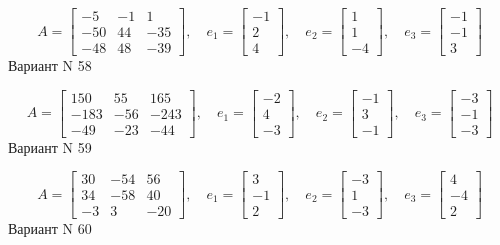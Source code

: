 \documentclass[11pt]{report}
\begin{document}
$$A = \left[\begin{matrix}-5 & -1 & 1\\-50 & 44 & -35\\-48 & 48 & -39\end{matrix}\right],\quad e_1 = \left[\begin{matrix}-1\\2\\4\end{matrix}\right],\quad e_2 = \left[\begin{matrix}1\\1\\-4\end{matrix}\right],\quad e_3 = \left[\begin{matrix}-1\\-1\\3\end{matrix}\right]$$Вариант N 58

$$A = \left[\begin{matrix}150 & 55 & 165\\-183 & -56 & -243\\-49 & -23 & -44\end{matrix}\right],\quad e_1 = \left[\begin{matrix}-2\\4\\-3\end{matrix}\right],\quad e_2 = \left[\begin{matrix}-1\\3\\-1\end{matrix}\right],\quad e_3 = \left[\begin{matrix}-3\\-1\\-3\end{matrix}\right]$$Вариант N 59

$$A = \left[\begin{matrix}30 & -54 & 56\\34 & -58 & 40\\-3 & 3 & -20\end{matrix}\right],\quad e_1 = \left[\begin{matrix}3\\-1\\2\end{matrix}\right],\quad e_2 = \left[\begin{matrix}-3\\1\\-3\end{matrix}\right],\quad e_3 = \left[\begin{matrix}4\\-4\\2\end{matrix}\right]$$Вариант N 60
\end{document}
